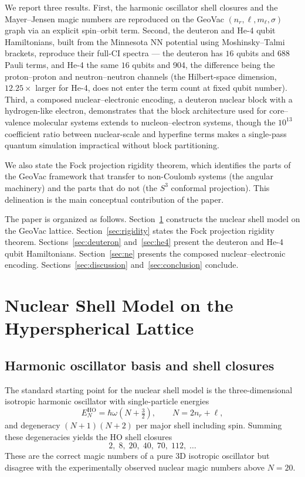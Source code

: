 \documentclass[twocolumn,prc,amsmath,amssymb,superscriptaddress]{revtex4-2}
\newcommand{\gvq}[2]{#2}
\begin{document}
We report three results. First, the harmonic oscillator shell closures
and the Mayer--Jensen magic numbers are reproduced on the GeoVac
$(n_r, \ell, m_\ell, \sigma)$ graph via an explicit spin--orbit term.
Second, the deuteron and He-4 qubit Hamiltonians, built from the
Minnesota NN potential using Moshinsky--Talmi brackets, reproduce
their full-CI spectra --- the deuteron has $16$ qubits and
\gvq{p23_deuteron_pauli}{688} Pauli terms, and He-4 the same $16$ qubits and
\gvq{p23_he4_pauli}{904}, the
difference being the proton--proton and neutron--neutron channels (the
Hilbert-space dimension, $12.25\times$ larger for He-4, does not enter
the term count at fixed qubit number). Third, a composed
nuclear--electronic encoding, a deuteron nuclear block with a
hydrogen-like electron, demonstrates that the block architecture used for
core--valence molecular systems extends to nucleon--electron systems,
though the $10^{13}$ coefficient ratio between nuclear-scale and
hyperfine terms makes a single-pass quantum simulation impractical
without block partitioning.

We also state the Fock projection rigidity theorem, which identifies
the parts of the GeoVac framework that transfer to non-Coulomb systems
(the angular machinery) and the parts that do not (the $S^3$ conformal
projection). This delineation is the main conceptual contribution of
the paper.

The paper is organized as follows. Section~\ref{sec:shell} constructs
the nuclear shell model on the GeoVac lattice. Section~\ref{sec:rigidity}
states the Fock projection rigidity theorem. Sections~\ref{sec:deuteron}
and~\ref{sec:he4} present the deuteron and He-4 qubit Hamiltonians.
Section~\ref{sec:ne} presents the composed nuclear--electronic
encoding. Sections~\ref{sec:discussion} and~\ref{sec:conclusion}
conclude.

\section{Nuclear Shell Model on the Hyperspherical Lattice}
\label{sec:shell}

\subsection{Harmonic oscillator basis and shell closures}

The standard starting point for the nuclear shell model is the
three-dimensional isotropic harmonic oscillator with single-particle
energies
\begin{equation}
  E_N^{\mathrm{HO}} = \hbar\omega \left(N + \tfrac{3}{2}\right),
  \qquad
  N = 2 n_r + \ell,
\label{eq:ho-energy}
\end{equation}
and degeneracy $(N+1)(N+2)$ per major shell including spin. Summing
these degeneracies yields the HO shell closures
\[
  2, \; 8, \; 20, \; 40, \; 70, \; 112, \; \ldots
\]
These are the correct magic numbers of a pure 3D isotropic oscillator
but disagree with the experimentally observed nuclear magic numbers
above $N=20$.
\end{document}
